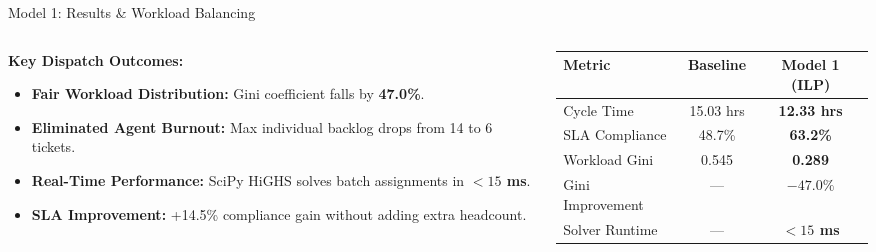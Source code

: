 \documentclass[10pt,aspectratio=169]{beamer}
\begin{document}
\begin{frame}{Model 1: Results \& Workload Balancing}
    \begin{columns}[c]
        \begin{column}{0.48\textwidth}
            \textbf{Key Dispatch Outcomes:}
            \vspace{0.2cm}
            \begin{itemize}
                \setlength\itemsep{0.7em}
                \item \textbf{Fair Workload Distribution:} Gini coefficient falls by \textbf{47.0\%}.
                \item \textbf{Eliminated Agent Burnout:} Max individual backlog drops from 14 to 6 tickets.
                \item \textbf{Real-Time Performance:} SciPy HiGHS solves batch assignments in \textbf{$<15$ ms}.
                \item \textbf{SLA Improvement:} +14.5\% compliance gain without adding extra headcount.
            \end{itemize}
        \end{column}
        \begin{column}{0.48\textwidth}
            \centering
            \begin{table}[]
                \small
                \begin{tabular}{lcc}
                    \toprule
                    \textbf{Metric} & \textbf{Baseline} & \textbf{Model 1 (ILP)} \\
                    \midrule
                    Cycle Time & 15.03 hrs & \textbf{12.33 hrs} \\
                    SLA Compliance & 48.7\% & \textbf{63.2\%} \\
                    Workload Gini & 0.545 & \textbf{0.289} \\
                    Gini Improvement & --- & \textbf{$-47.0\%$} \\
                    Solver Runtime & --- & \textbf{$< 15$ ms} \\
                    \bottomrule
                \end{tabular}
            \end{table}
        \end{column}
    \end{columns}
\end{frame}
\end{document}
